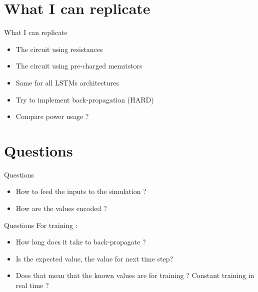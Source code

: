 \documentclass{beamer}
\begin{document}
\section{What I can replicate}
\begin{frame}{What I can replicate}
  \begin{itemize}
    \item The circuit using resistances
    \item The circuit using pre-charged memristors
    \item Same for all LSTMs architectures
    \item Try to implement back-propagation (HARD)
    \item Compare power usage ?
  \end{itemize}
\end{frame}


\section{Questions}
\begin{frame}{Questions}
  \begin{itemize}
    \item How to feed the inputs to the simulation ?
    \item How are the values encoded ?
  \end{itemize}
\end{frame}

\begin{frame}{Questions}
  For training :
  \begin{itemize}
    \item How long does it take to back-propagate ?
    \item Is the expected value, the value for next time step?
    \item Does that mean that the known values are for training ? Constant training in real time ?
  \end{itemize}
\end{frame}
\end{document}
